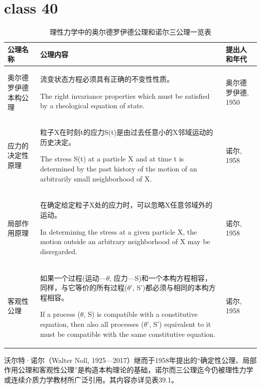\documentclass[12pt, a4paper, oneside, UTF8]{ctexbook}  %
\begin{document}
\section{class 40}

\begin{longtable}{|p{}|p{}|p{}|}
    \caption{理性力学中的奥尔德罗伊德公理和诺尔三公理一览表} \\
    \hline
    \textbf{公理名称} & \textbf{公理内容} & \textbf{提出人和年代} \\
    \hline
    \endfirsthead
    
    奥尔德罗伊德本构公理 & 
    流变状态方程必须具有正确的不变性性质。\par 
    The right invariance properties which must be satisfied by a rheological equation of state. & 
    奥尔德罗伊德, 1950 \\
    \hline
    
    应力的决定性原理 & 
    粒子X在时刻t的应力S(t)是由过去任意小的X邻域运动的历史决定。\par 
    The stress S(t) at a particle X and at time t is determined by the past history of the motion of an arbitrarily small neighborhood of X. & 
    诺尔, 1958 \\
    \hline
    
    局部作用原理 & 
    在确定给定粒子X处的应力时，可以忽略X任意邻域外的运动。\par
    In determining the stress at a given particle X, the motion outside an arbitrary neighborhood of X may be disregarded. & 
    诺尔, 1958 \\
    \hline
    
    客观性公理 & 
    如果一个过程(运动---$\theta$, 应力---S)和一个本构方程相容， 
    同样，与它等价的所有过程($\theta$', S')都必须与相同的本构方程相容。\par
    If a process ($\theta$, S) is compatible with a constitutive equation, then also all processes ($\theta$', S') equivalent to it must be compatible with the same constitutive equation. & 
    诺尔, 1958 \\
    \hline
\end{longtable}

沃尔特·诺尔（Walter Noll, 1925—2017）继而于1958年提出的“确定性公理、局部作用公理和客观性公理”是构造本构理论的基础，诺尔而三公理迄今仍被理性力学或连续介质力学教材所广泛引用。其内容亦详见表39.1。
\end{document}
